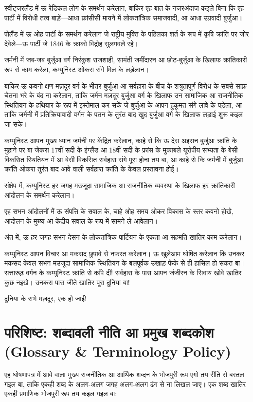 \documentclass[12pt,a4paper,oneside]{book}
\begin{document}
स्वीट्जरलैंड में ऊ रेडिकल लोग के समर्थन करेलान, बाकिर एह बात के नजरअंदाज कइले बिना कि एह पार्टी में विरोधी तत्व बाड़ें—आधा फ्रांसीसी मायने में लोकतांत्रिक समाजवादी, आ आधा उग्रवादी बुर्जुआ।

पोलैंड में ऊ ओह पार्टी के समर्थन करेलान जे राष्ट्रीय मुक्ति के पहिलका शर्त के रूप में कृषि क्रांति पर जोर देवेले—ऊ पार्टी जे 1846 के क्राको विद्रोह सुलगवले रहे।

जर्मनी में जब-जब बुर्जुआ वर्ग निरंकुश राजशाही, सामंती जमींदारन आ छोट-बुर्जुआ के खिलाफ क्रांतिकारी रूप से काम करेला, कम्युनिस्ट ओकरा संगे मिल के लड़ेलान।

बाकिर ऊ कवनो क्षण मज़दूर वर्ग के भीतर बुर्जुआ आ सर्वहारा के बीच के शत्रुतापूर्ण विरोध के सबसे साफ़ चेतना भरे के बंद ना करेलान, ताकि जर्मन मज़दूर बुर्जुआ वर्ग के खिलाफ उन सामाजिक आ राजनीतिक स्थितियन के हथियार के रूप में इस्तेमाल कर सकें जे बुर्जुआ के आपन हुकूमत संगे लावे के पड़ेला, आ ताकि जर्मनी में प्रतिक्रियावादी वर्गन के पतन के तुरंत बाद खुद बुर्जुआ वर्ग के खिलाफ लड़ाई शुरू कइल जा सके।

कम्युनिस्ट आपन मुख्य ध्यान जर्मनी पर केंद्रित करेलान, काहे से कि ऊ देस अइसन बुर्जुआ क्रांति के मुहाने पर बा जेकरा 17वीं सदी के इंग्लैंड आ 18वीं सदी के फ्रांस के मुकाबले यूरोपीय सभ्यता के बेसी विकसित स्थितियन में आ बेसी विकसित सर्वहारा संगे पूरा होना तय बा, आ काहे से कि जर्मनी में बुर्जुआ क्रांति ओकरा तुरंत बाद आवे वाली सर्वहारा क्रांति के केवल प्रस्तावना होई।

संक्षेप में, कम्युनिस्ट हर जगह मउजूदा सामाजिक आ राजनीतिक व्यवस्था के खिलाफ हर क्रांतिकारी आंदोलन के समर्थन करेलान।

एह सभन आंदोलनों में ऊ संपत्ति के सवाल के, चाहे ओह समय ओकर विकास के स्तर कवनो होखे, आंदोलन के मुख्य आ केंद्रीय सवाल के रूप में सामने ले आवेलान।

अंत में, ऊ हर जगह सभन देसन के लोकतांत्रिक पार्टियन के एकता आ सहमति खातिर काम करेलान।

कम्युनिस्ट आपन विचार आ मकसद छुपावे से नफरत करेलान। ऊ खुलेआम घोषित करेलान कि उनकर मकसद केवल सभन मउजूदा सामाजिक स्थितियन के बलपूर्वक उखाड़ फेंके से ही हासिल हो सकत बा। सत्तारूढ़ वर्गन के कम्युनिस्ट क्रांति से काँपे दीं! सर्वहारा के पास आपन जंजीरन के सिवाय खोवे खातिर कुछ नइखे। उनकरा पास जीते खातिर पूरा दुनिया बा!

दुनिया के सभे मज़दूर, एक हो जाईं!

\cleardoublepage
\chapter*{परिशिष्ट: शब्दावली नीति आ प्रमुख शब्दकोश {\engfont (Glossary \& Terminology Policy)}}
एह घोषणापत्र में आवे वाला मुख्य राजनीतिक आ आर्थिक शब्दन के भोजपुरी रूप एगो तय रीति से बरतल गइल बा, ताकि एकही शब्द के अलग-अलग जगह अलग-अलग ढंग से ना लिखल जाए। एक शब्द खातिर एकही प्रमाणिक भोजपुरी रूप तय कइल गइल बा:
\end{document}
